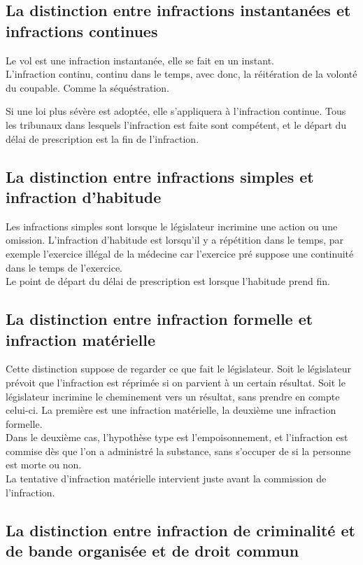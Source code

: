 \documentclass[10pt, a4paper, openany]{book}
\begin{document}
\subsection{La distinction entre infractions instantanées et infractions continues}

Le vol est une infraction instantanée, elle se fait en un instant. \\
L'infraction continu, continu dans le temps, avec donc, la réitération de la volonté du coupable. Comme la séquéstration.


Si une loi plus sévère est adoptée, elle s'appliquera à l'infraction continue. Tous les tribunaux dans lesquels l'infraction est faite sont compétent, et le départ du délai de prescription est la fin de l'infraction. 

\subsection{La distinction entre infractions simples et infraction d'habitude}

Les infractions simples sont lorsque le législateur incrimine une action ou une omission. L'infraction d'habitude est lorsqu'il y a répétition dans le temps, par exemple l'exercice illégal de la médecine car l'exercice pré suppose une continuité dans le temps de l'exercice. \\
Le point de départ du délai de prescription est lorsque l'habitude prend fin. 

\subsection{La distinction entre infraction formelle et infraction matérielle}

Cette distinction suppose de regarder ce que fait le législateur. Soit le législateur prévoit que l'infraction est réprimée si on parvient à un certain résultat. Soit le législateur incrimine le cheminement vers un résultat, sans prendre en compte celui-ci. La première est une infraction matérielle, la deuxième une infraction formelle. \\
Dans le deuxième cas, l'hypothèse type est l'empoisonnement, et l'infraction est commise dès que l'on a administré la substance, sans s'occuper de si la personne est morte ou non. \\
La tentative d'infraction matérielle intervient juste avant la commission de l'infraction.

\subsection{La distinction entre infraction de criminalité et de bande organisée et de droit commun}
\end{document}
